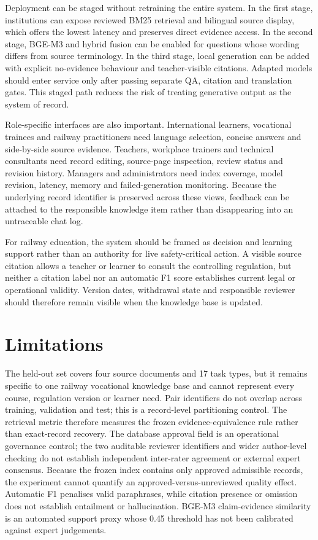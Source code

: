 Deployment can be staged without retraining the entire system. In the first stage, institutions can expose reviewed BM25 retrieval and bilingual source display, which offers the lowest latency and preserves direct evidence access. In the second stage, BGE-M3 and hybrid fusion can be enabled for questions whose wording differs from source terminology. In the third stage, local generation can be added with explicit no-evidence behaviour and teacher-visible citations. Adapted models should enter service only after passing separate QA, citation and translation gates. This staged path reduces the risk of treating generative output as the system of record.

Role-specific interfaces are also important. International learners, vocational trainees and railway practitioners need language selection, concise answers and side-by-side source evidence. Teachers, workplace trainers and technical consultants need record editing, source-page inspection, review status and revision history. Managers and administrators need index coverage, model revision, latency, memory and failed-generation monitoring. Because the underlying record identifier is preserved across these views, feedback can be attached to the responsible knowledge item rather than disappearing into an untraceable chat log.

For railway education, the system should be framed as decision and learning support rather than an authority for live safety-critical action. A visible source citation allows a teacher or learner to consult the controlling regulation, but neither a citation label nor an automatic F1 score establishes current legal or operational validity. Version dates, withdrawal state and responsible reviewer should therefore remain visible when the knowledge base is updated.

\section{Limitations}

The held-out set covers four source documents and 17 task types, but it remains specific to one railway vocational knowledge base and cannot represent every course, regulation version or learner need. Pair identifiers do not overlap across training, validation and test; this is a record-level partitioning control. The retrieval metric therefore measures the frozen evidence-equivalence rule rather than exact-record recovery. The database approval field is an operational governance control; the two auditable reviewer identifiers and wider author-level checking do not establish independent inter-rater agreement or external expert consensus. Because the frozen index contains only approved admissible records, the experiment cannot quantify an approved-versus-unreviewed quality effect. Automatic F1 penalises valid paraphrases, while citation presence or omission does not establish entailment or hallucination. BGE-M3 claim-evidence similarity is an automated support proxy whose 0.45 threshold has not been calibrated against expert judgements.

